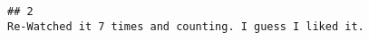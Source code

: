 \documentclass[
]{article}
\begin{document}
\begin{verbatim}
## 2                                                                                                                                                                                                                                                                                                                                                                                                                                                                                                                                                                                                                                                                                                                                                                                                                                                                                                                                                                                                                                                                                                                                                                                                                                                                                                                                                                                                                                                                                                                                                                                                                                                                                                                                                                                                                                                                                                                                                                                                                                                                                                                                                           Re-Watched it 7 times and counting. I guess I liked it.

\end{verbatim}
\end{document}
